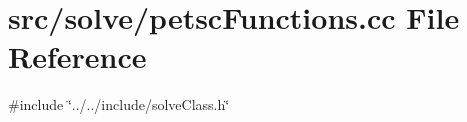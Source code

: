 \section{src/solve/petsc\+Functions.cc File Reference}
\label{petsc_functions_8cc}
{\ttfamily \#include \char`\"{}../../include/solve\+Class.\+h\char`\"{}}\newline
